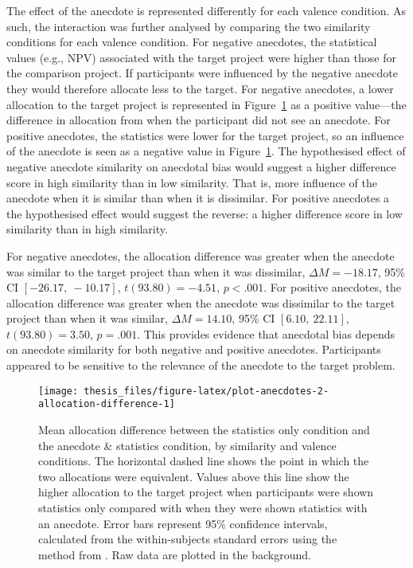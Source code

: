 \documentclass[a4paper, nobind]{templates/ociamthesis}
\theoremstyle{definition}
\theoremstyle{definition}
\theoremstyle{definition}
\theoremstyle{definition}
\theoremstyle{remark}
\begin{document}
The effect of the anecdote is represented differently for each valence
condition. As such, the interaction was further analysed by comparing the two
similarity conditions for each valence condition. For negative anecdotes, the
statistical values (e.g., NPV) associated with the target project were higher
than those for the comparison project. If participants were influenced by the
negative anecdote they would therefore allocate less to the target. For negative
anecdotes, a lower allocation to the target project is represented in
Figure~\ref{fig:plot-anecdotes-2-allocation-difference} as a positive
value---the difference in allocation from when the participant did not see an
anecdote. For positive anecdotes, the statistics were lower for the target
project, so an influence of the anecdote is seen as a negative value in
Figure~\ref{fig:plot-anecdotes-2-allocation-difference}. The hypothesised
effect of negative anecdote similarity on anecdotal bias would suggest a higher
difference score in high similarity than in low similarity. That is, more
influence of the anecdote when it is similar than when it is dissimilar. For
positive anecdotes a the hypothesised effect would suggest the reverse: a higher
difference score in low similarity than in high similarity.

For negative anecdotes, the allocation difference was greater when the anecdote
was similar to the target project than when it was dissimilar,
\(\Delta M = -18.17\), 95\% CI \([-26.17,~-10.17]\), \(t(93.80) = -4.51\), \(p < .001\). For positive
anecdotes, the allocation difference was greater when the anecdote was
dissimilar to the target project than when it was similar,
\(\Delta M = 14.10\), 95\% CI \([6.10,~22.11]\), \(t(93.80) = 3.50\), \(p = .001\). This provides
evidence that anecdotal bias depends on anecdote similarity for both negative
and positive anecdotes. Participants appeared to be sensitive to the relevance
of the anecdote to the target problem.



\begin{figure}
\texttt{[image: thesis\_files/figure-latex/plot-anecdotes-2-allocation-difference-1]} \caption{Mean allocation difference between the statistics only condition and the anecdote \& statistics condition, by similarity and valence conditions. The horizontal dashed line shows the point in which the two allocations were equivalent. Values above this line show the higher allocation to the target project when participants were shown statistics only compared with when they were shown statistics with an anecdote. Error bars represent 95\% confidence intervals, calculated from the within-subjects standard errors using the method from \textcite{cousineau2014}. Raw data are plotted in the background.}\label{fig:plot-anecdotes-2-allocation-difference}
\end{figure}
\end{document}
